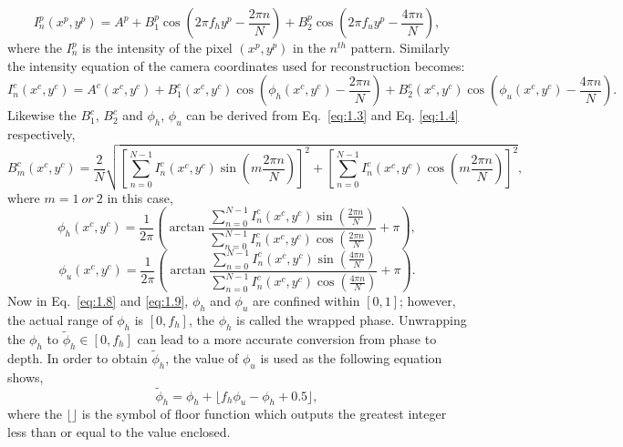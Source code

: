 \documentclass[]{spie}  %
\begin{document}
  \begin{equation} \label{eq:1.5}
  	I^p_n(x^p, y^p) = A^p + B^p_1\cos\left(2\pi f_h y^p - \frac{2\pi n}{N}\right) + B^p_2\cos\left(2\pi f_u y^p - \frac{4\pi n}{N}\right),
  \end{equation}
where the $I^p_n$ is the intensity of the pixel $(x^p, y^p)$ in the $n^{th}$ pattern. Similarly the intensity equation of the camera coordinates used for reconstruction becomes:
 \begin{equation} \label{eq:1.6}
  	I^c_n(x^c, y^c) =  A^c(x^c, y^c) + B^c_1(x^c, y^c)\cos\left(\phi_h(x^c, y^c) - \frac{2\pi n}{N}\right) + B^c_2(x^c, y^c)\cos\left(\phi_u(x^c, y^c) - \frac{4\pi n}{N}\right).
  \end{equation}
Likewise the $B^c_1$, $B^c_2$ and $\phi_h$, $\phi_u$ can be derived from Eq.~\eqref{eq:1.3} and Eq. \eqref{eq:1.4} respectively,
  \begin{equation} \label{eq:1.7}
  	B^c_m(x^c, y^c) = \frac{2}{N}\sqrt{\left[\sum_{n=0}^{N-1}I_n^c(x^c, y^c)\sin (m\frac{2\pi n}{N})\right]^2 + \left[\sum_{n=0}^{N-1}I_n^c(x^c, y^c)\cos (m\frac{2\pi n}{N})\right]^2},
  \end{equation}
where $m = 1\: or\: 2$ in this case,
 \begin{equation} \label{eq:1.8}
  	\phi_h (x^c, y^c) = \frac{1}{2\pi}\left(\arctan \frac{\sum_{n=0}^{N-1} I^c_n(x^c, y^c)\sin(\frac{2\pi n}{N})}{\sum_{n=0}^{N-1} I^c_n(x^c, y^c)\cos(\frac{2\pi n}{N})} + \pi\right),
  \end{equation}
 \begin{equation} \label{eq:1.9}
  	\phi_u (x^c, y^c) = \frac{1}{2\pi}\left(\arctan \frac{\sum_{n=0}^{N-1} I^c_n(x^c, y^c)\sin(\frac{4\pi n}{N})}{\sum_{n=0}^{N-1} I^c_n(x^c, y^c)\cos(\frac{4\pi n}{N})} + \pi\right).
  \end{equation}
Now in Eq.~\eqref{eq:1.8} and \eqref{eq:1.9}, $\phi_h$ and $\phi_u$ are confined within $[0, 1]$; however, the actual range of $\phi_h$ is $[0, f_h]$, the  $\phi_h$ is called the wrapped phase. Unwrapping the $\phi_h$ to $\tilde{\phi}_h \in [0, f_h]$ can lead to a more accurate conversion from phase to depth.  In order to obtain $\tilde{\phi}_h$, the value of $\phi_u$ is used as the following equation shows,
  \begin{equation} \label{eq:1.10}
	 \tilde{\phi}_h = \phi_h + \lfloor f_h \phi_u - \phi_h + 0.5 \rfloor,
  \end{equation}
where the $\lfloor \rfloor$ is the symbol of floor function which outputs the greatest integer less than or equal to the value enclosed.
\end{document}
